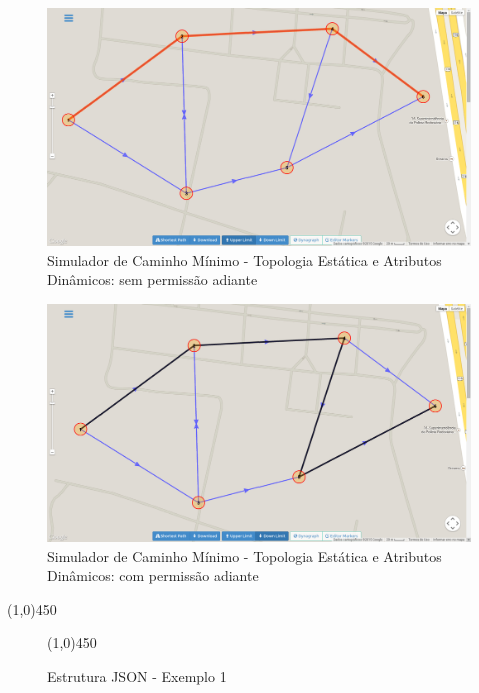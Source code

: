 \begin{figure}[htbp]
\centering
 \includegraphics[width=.90\textwidth]{chapters/fig/validacao/upperlimit.png}
\caption{Simulador de Caminho Mínimo - Topologia Estática e Atributos Dinâmicos: sem permissão adiante}
\label{fig:upperlimit}
\end{figure}
\FloatBarrier

\begin{figure}[htbp]
\centering
 \includegraphics[width=.90\textwidth]{chapters/fig/validacao/downlimit.png}
\caption{Simulador de Caminho Mínimo - Topologia Estática e Atributos Dinâmicos: com permissão adiante}
\label{fig:downlimit}
\end{figure}
\FloatBarrier

\begin{center}
  \line(1,0){450}
\end{center}

\begin{figure}[htbp]
  \begin{center}
    \line(1,0){450}
  \end{center}
  \centering
  \caption{Estrutura JSON - Exemplo 1}
  \label{fig:jsondyn}
\end{figure}
\FloatBarrier

